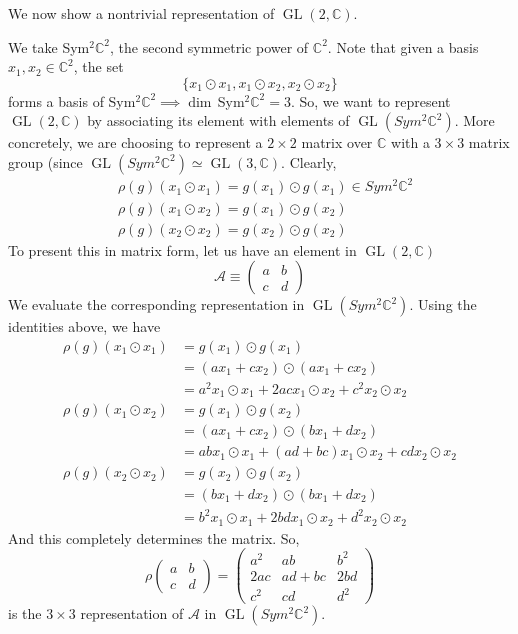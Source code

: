 \documentclass{article}
\DeclareMathOperator{\GL}{GL}
\begin{document}
  We now show a nontrivial representation of $\GL(2, \mathbb{C})$. 
  \begin{example}
  We take Sym$^2 \mathbb{C}^2$, the second symmetric power of $\mathbb{C}^2$. Note that given a basis $x_1, x_2 \in \mathbb{C}^2$, the set
  \[\{x_1 \odot x_1, x_1 \odot x_2, x_2 \odot x_2\}\]
  forms a basis of Sym$^2 \mathbb{C}^2 \implies \dim\,$Sym$^2 \mathbb{C}^2 = 3$. So, we want to represent $\GL(2, \mathbb{C})$ by associating its element with elements of $\GL(Sym^2 \mathbb{C}^2)$. More concretely, we are choosing to represent a $2 \times 2$ matrix over $\mathbb{C}$ with a $3 \times 3$ matrix group (since $\GL(Sym^2 \mathbb{C}^2) \simeq \GL(3, \mathbb{C})$. Clearly,
  \begin{align*}
      & \rho(g) (x_1 \odot x_1) = g(x_1) \odot g(x_1) \in Sym^2 \mathbb{C}^2 \\
      & \rho(g) (x_1 \odot x_2) = g(x_1) \odot g(x_2) \\
      & \rho(g) (x_2 \odot x_2) = g(x_2) \odot g(x_2)
  \end{align*}
  To present this in matrix form, let us have an element in $\GL (2, \mathbb{C})$
  \[\mathcal{A} \equiv \begin{pmatrix}
  a & b \\
  c & d
  \end{pmatrix}\]
  We evaluate the corresponding representation in $\GL( Sym^2 \mathbb{C}^2)$. Using the identities above, we have 
  \begin{align*}
      \rho(g) (x_1 \odot x_1) & = g(x_1) \odot g(x_1) \\
      & = (a x_1 + c x_2) \odot (a x_1 + c x_2) \\
      & = a^2 x_1 \odot x_1 + 2ac x_1 \odot x_2 + c^2 x_2 \odot x_2 \\
      \rho(g) (x_1 \odot x_2) & = g(x_1) \odot g(x_2) \\
      & = (a x_1 + c x_2) \odot (b x_1 + d x_2) \\
      & = ab x_1 \odot x_1 + (ad + bc) x_1 \odot x_2 + cd x_2 \odot x_2 \\
      \rho(g) (x_2 \odot x_2) & = g(x_2) \odot g(x_2) \\
      & = (b x_1 + d x_2) \odot (b x_1 + d x_2) \\
      & = b^2 x_1 \odot x_1 + 2bd x_1 \odot x_2 + d^2 x_2 \odot x_2
  \end{align*}
  And this completely determines the matrix. So, 
  \[\rho \begin{pmatrix}
  a&b\\c&d
  \end{pmatrix} = \begin{pmatrix}
  a^2&ab&b^2\\2ac&ad+bc&2bd\\c^2&cd&d^2
  \end{pmatrix}\]
  is the $3 \times 3$ representation of $\mathcal{A}$ in $\GL(Sym^2 \mathbb{C}^2)$. 
  \end{example}
\end{document}
